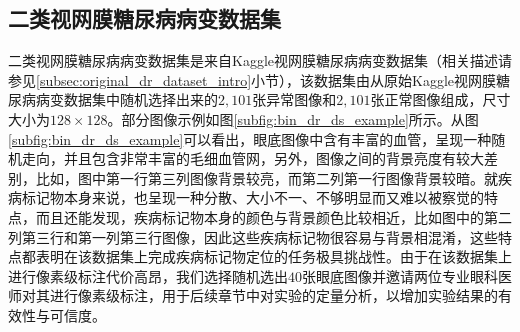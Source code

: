 \subsection{二类视网膜糖尿病病变数据集}\label{subsec:bin_dr_ds}
二类视网膜糖尿病病变数据集是来自Kaggle视网膜糖尿病病变数据集（相关描述请参见\ref{subsec:original_dr_dataset_intro}小节），该数据集由从原始Kaggle视网膜糖尿病病变数据集中随机选择出来的$2,101$张异常图像和$2,101$张正常图像组成，尺寸大小为$128\times 128$。部分图像示例如图\ref{subfig:bin_dr_ds_example}所示。从图\ref{subfig:bin_dr_ds_example}可以看出，眼底图像中含有丰富的血管，呈现一种随机走向，并且包含非常丰富的毛细血管网，另外，图像之间的背景亮度有较大差别，比如，图中第一行第三列图像背景较亮，而第二列第一行图像背景较暗。就疾病标记物本身来说，也呈现一种分散、大小不一、不够明显而又难以被察觉的特点，而且还能发现，疾病标记物本身的颜色与背景颜色比较相近，比如图中的第二列第三行和第一列第三行图像，因此这些疾病标记物很容易与背景相混淆，这些特点都表明在该数据集上完成疾病标记物定位的任务极具挑战性。由于在该数据集上进行像素级标注代价高昂，我们选择随机选出$40$张眼底图像并邀请两位专业眼科医师对其进行像素级标注，用于后续章节中对实验的定量分析，以增加实验结果的有效性与可信度。





